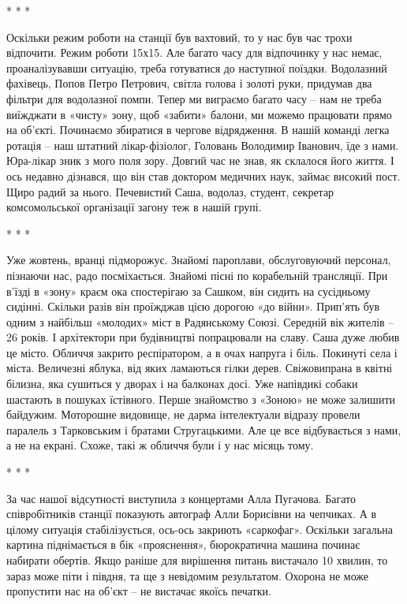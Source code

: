
* * *

Оскільки режим роботи на станції був вахтовий, то у нас був час трохи
відпочити. Режим роботи 15х15. Але багато часу для відпочинку у нас немає,
проаналізувавши ситуацію, треба готуватися до наступної поїздки. Водолазний
фахівець, Попов Петро Петрович, світла голова і золоті руки, придумав два
фільтри для водолазної помпи. Тепер ми виграємо багато часу – нам не треба
виїжджати в «чисту» зону, щоб «забити» балони, ми можемо працювати прямо на
об'єкті. Починаємо збиратися в чергове відрядження. В нашій команді легка
ротація – наш штатний лікар-фізіолог, Головань Володимир Іванович, їде з нами.
Юра-лікар зник з мого поля зору. Довгий час не знав, як склалося його життя. І
ось недавно дізнався, що він став доктором медичних наук, займає високий пост.
Щиро радий за нього. Печевистий Саша, водолаз, студент, секретар комсомольської
організації загону теж в нашій групі.


* * *

Уже жовтень, вранці підморожує. Знайомі пароплави, обслуговуючий персонал,
пізнаючи нас, радо посміхається. Знайомі пісні по корабельній трансляції. При
в'їзді в «зону» краєм ока спостерігаю за Сашком, він сидить на сусідньому
сидінні. Скільки разів він проїжджав цією дорогою «до війни». Прип'ять був
одним з найбільш «молодих» міст в Радянському Союзі. Середній вік жителів – 26
років. І архітектори при будівництві попрацювали на славу. Саша дуже любив це
місто. Обличчя закрито респіратором, а в очах напруга і біль. Покинуті села і
міста. Величезні яблука, від яких ламаються гілки дерев. Свіжовипрана в квітні
білизна, яка сушиться у дворах і на балконах досі. Уже напівдикі собаки
шастають в пошуках їстівного. Перше знайомство з «Зоною» не може залишити
байдужим. Моторошне видовище, не дарма інтелектуали відразу провели паралель з
Тарковським і братами Стругацькими. Але це все відбувається з нами, а не на
екрані. Схоже, такі ж обличчя були і у нас місяць тому.


* * *

За час нашої відсутності виступила з концертами Алла Пугачова. Багато
співробітників станції показують автограф Алли Борисівни на чепчиках. А в
цілому ситуація стабілізується, ось-ось закриють «саркофаг». Оскільки загальна
картина піднімається в бік «прояснення», бюрократична машина починає набирати
обертів. Якщо раніше для вирішення питань вистачало 10 хвилин, то зараз може
піти і півдня, та ще з невідомим результатом. Охорона не може пропустити нас на
об'єкт – не вистачає якоїсь печатки.

